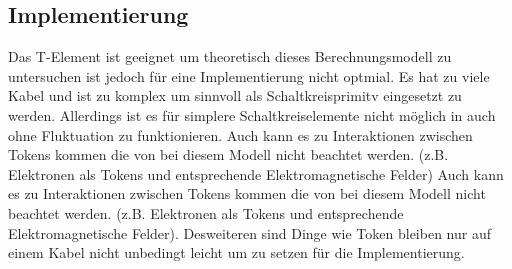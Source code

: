 \documentclass[11pt,a4paper]{article}
\begin{document}
\subsection{Implementierung}
Das T-Element ist geeignet um theoretisch dieses Berechnungsmodell zu 
untersuchen ist jedoch für eine Implementierung nicht optmial.
%
Es hat zu viele Kabel und ist zu komplex um sinnvoll als Schaltkreisprimitv
eingesetzt zu werden. 
%
Allerdings ist es für simplere Schaltkreiselemente nicht möglich in auch ohne 
Fluktuation zu funktionieren.
%
Auch kann es zu Interaktionen zwischen Tokens kommen die von bei diesem Modell
nicht beachtet werden. (z.B. Elektronen als Tokens und entsprechende 
Elektromagnetische Felder)
%
Auch kann es zu Interaktionen zwischen Tokens kommen die von bei diesem Modell
nicht beachtet werden. (z.B. Elektronen als Tokens und entsprechende 
Elektromagnetische Felder). Desweiteren sind Dinge wie Token bleiben nur
auf einem Kabel nicht unbedingt leicht um zu setzen für die Implementierung.





\end{document}

